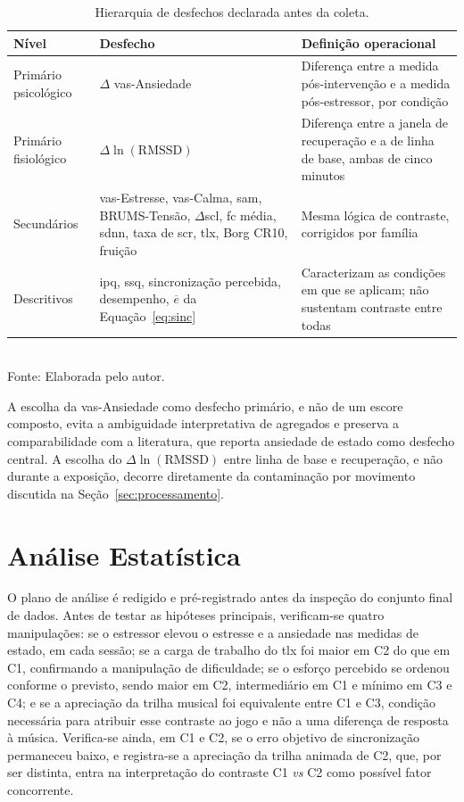 \begin{table}[H]
    \centering
    \caption{Hierarquia de desfechos declarada antes da coleta.}
    \label{tab:desfechos}
    \small
    \begin{tabularx}{\textwidth}{p{2.4cm}p{4.4cm}Y}
        \toprule
        \textbf{Nível} & \textbf{Desfecho} & \textbf{Definição operacional} \\
        \midrule
        Primário psicológico & $\Delta$ \gls{vas}-Ansiedade & Diferença entre a medida pós-intervenção e a medida pós-estressor, por condição \\
        \addlinespace
        Primário fisiológico & $\Delta \ln(\mathrm{RMSSD})$ & Diferença entre a janela de recuperação e a de linha de base, ambas de cinco minutos \\
        \addlinespace
        Secundários & \gls{vas}-Estresse, \gls{vas}-Calma, \gls{sam}, BRUMS-Tensão, $\Delta$\gls{scl}, \gls{fc} média, \gls{sdnn}, taxa de \gls{scr}, \gls{tlx}, Borg CR10, fruição & Mesma lógica de contraste, corrigidos por família \\
        \addlinespace
        Descritivos & \gls{ipq}, \gls{ssq}, sincronização percebida, desempenho, $\overline{e}$ da Equação~\ref{eq:sinc} & Caracterizam as condições em que se aplicam; não sustentam contraste entre todas \\
        \bottomrule
    \end{tabularx}\\[2pt]
    {\footnotesize Fonte: Elaborada pelo autor.}
\end{table}

A escolha da \gls{vas}-Ansiedade como desfecho primário, e não de um escore composto, evita a ambiguidade interpretativa de agregados e preserva a comparabilidade com a literatura, que reporta ansiedade de estado como desfecho central. A escolha do $\Delta \ln(\mathrm{RMSSD})$ entre linha de base e recuperação, e não durante a exposição, decorre diretamente da contaminação por movimento discutida na Seção~\ref{sec:processamento}.

\section{Análise Estatística}\label{sec:analise}

O plano de análise é redigido e pré-registrado antes da inspeção do conjunto final de dados. Antes de testar as hipóteses principais, verificam-se quatro manipulações: se o estressor elevou o estresse e a ansiedade nas medidas de estado, em cada sessão; se a carga de trabalho do \gls{tlx} foi maior em C2 do que em C1, confirmando a manipulação de dificuldade; se o esforço percebido se ordenou conforme o previsto, sendo maior em C2, intermediário em C1 e mínimo em C3 e C4; e se a apreciação da trilha musical foi equivalente entre C1 e C3, condição necessária para atribuir esse contraste ao jogo e não a uma diferença de resposta à música. Verifica-se ainda, em C1 e C2, se o erro objetivo de sincronização permaneceu baixo, e registra-se a apreciação da trilha animada de C2, que, por ser distinta, entra na interpretação do contraste C1 \textit{vs} C2 como possível fator concorrente.

